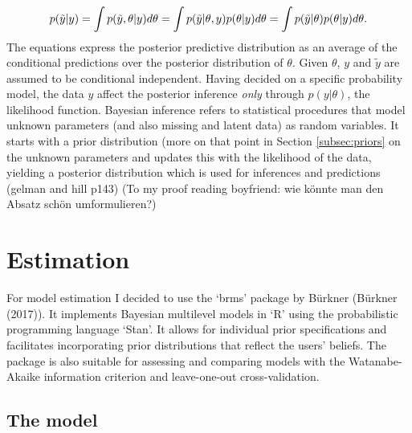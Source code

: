 \documentclass[a4, 12pt]{article}
\begin{document}
\[p(\tilde{y}|y)=\int p(\tilde{y},\theta|y)d\theta \\
= \int p(\tilde{y}|\theta,y)p(\theta|y)d\theta \\
= \int p(\tilde{y}|\theta)p(\theta|y)d\theta.\]
The equations express the posterior predictive distribution as an average of the conditional predictions over the posterior distribution of \(\theta\). Given \(\theta\), \(y\) and \(\tilde{y}\) are assumed to be conditional independent.
Having decided on a specific probability model, the data \(y\) affect the posterior inference \emph{only} through \(p(y|\theta)\), the likelihood function.
Bayesian inference refers to statistical procedures that model unknown parameters (and also missing and latent data) as random variables. It starts with a prior distribution (more on that point in Section \ref{subsec:priors} on the unknown parameters and updates this with the likelihood of the data, yielding a posterior distribution which is used for inferences and predictions (gelman and hill p143) (To my proof reading boyfriend: wie könnte man den Absatz schön umformulieren?)

\clearpage

\hypertarget{estimation}{%
\section{Estimation}\label{estimation}}

\label{ch:estimation}
For model estimation I decided to use the `brms' package by Bürkner (Bürkner (2017)). It implements Bayesian multilevel models in `R' using the probabilistic programming language `Stan'. It allows for individual prior specifications and facilitates incorporating prior distributions that reflect the users' beliefs. The package is also suitable for assessing and comparing models with the Watanabe-Akaike information criterion and leave-one-out cross-validation.

\hypertarget{the-model}{%
\subsection{The model}\label{the-model}}
\end{document}
